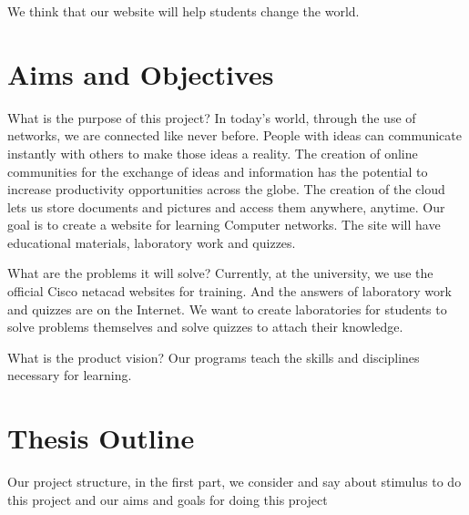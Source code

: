   We think that our website will help students change the world.






















\section{Aims and Objectives}
 
 What is the purpose of this project?
   In today’s world, through the use of networks, we are connected like never before. People with ideas can communicate instantly with others to make those ideas a reality. The creation of online communities for the exchange of ideas and information has the potential to increase productivity opportunities across the globe. The creation of the cloud lets us store documents and pictures and access them anywhere, anytime. Our goal is to create a website for learning Computer networks. The site will have educational materials, laboratory work and quizzes.

What are the problems it will solve?
  Currently, at the university, we use the official Cisco netacad websites for training. And the answers of laboratory work and quizzes are on the Internet. We want to create laboratories for students to solve problems themselves and solve quizzes to attach their knowledge.

What is the product vision? 
  Our programs teach the skills and disciplines necessary for learning.













\section{Thesis Outline}

   Our project structure, in the first part, we consider and say about stimulus to do this project and our aims and goals for doing this project
